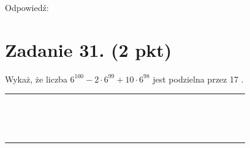 \documentclass[10pt]{article}
\begin{document}
Odpowiedź:

\section*{Zadanie 31. (2 pkt)}
Wykaż, że liczba \(6^{100}-2 \cdot 6^{99}+10 \cdot 6^{98}\) jest podzielna przez 17 .

\begin{center}
\begin{tabular}{|c|c|c|c|c|c|c|c|c|c|c|c|c|c|c|c|c|c|c|c|c|c|c|c|c|c|c|c|}
\hline
 &  &  &  &  &  &  &  &  &  &  &  &  &  &  &  &  &  &  &  &  &  &  &  &  &  &  &  \\
\hline
 &  &  &  &  &  &  &  &  &  &  &  &  &  &  &  &  &  &  &  &  &  &  &  &  &  &  &  \\
\hline
 &  &  &  &  &  &  &  &  &  &  &  &  &  &  &  &  &  &  &  &  &  &  &  &  &  &  &  \\
\hline
 &  &  &  &  &  &  &  &  &  &  &  &  &  &  &  &  &  &  &  &  &  &  &  &  &  &  &  \\
\hline
 &  &  &  &  &  &  &  &  &  &  &  &  &  &  &  &  &  &  &  &  &  &  &  &  &  &  &  \\
\hline
 &  &  &  &  &  &  &  &  &  &  &  &  &  &  &  &  &  &  &  &  &  &  &  &  &  &  &  \\
\hline
 &  &  &  &  &  &  &  &  &  &  &  &  &  &  &  &  &  &  &  &  &  &  &  &  &  &  &  \\
\hline
 &  &  &  &  &  &  &  &  &  &  &  &  &  &  &  &  &  &  &  &  &  &  &  &  &  &  &  \\
\hline
 &  &  &  &  &  &  &  &  &  &  &  &  &  &  &  &  &  &  &  &  &  &  &  &  &  &  &  \\
\hline
 &  &  &  &  &  &  &  &  &  &  &  &  &  &  &  &  &  &  &  &  &  &  &  &  &  &  &  \\
\hline
 &  &  &  &  &  &  &  &  &  &  &  &  &  &  &  &  &  &  &  &  &  &  &  &  &  &  &  \\
\hline
 &  &  &  &  &  &  &  &  &  &  &  &  &  &  &  &  &  &  &  &  &  &  &  &  &  &  &  \\
\hline
 &  &  &  &  &  &  &  &  &  &  &  &  &  &  &  &  &  &  &  &  &  &  &  &  &  &  &  \\
\hline
 &  &  &  &  &  &  &  &  &  &  &  &  &  &  &  &  &  &  &  &  &  &  &  &  &  &  &  \\
\hline
 &  &  &  &  &  &  &  &  &  &  &  &  &  &  &  &  &  &  &  &  &  &  &  &  &  &  &  \\
\hline
 &  &  &  &  &  &  &  &  &  &  &  &  &  &  &  &  &  &  &  &  &  &  &  &  &  &  &  \\

\end{tabular}
\end{center}
\end{document}
